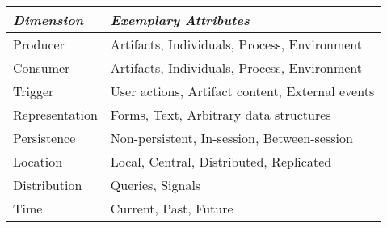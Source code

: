 \batchmode
%
\makeatletter







\def\PsfigVersion{1.9}

\makeatother
\newenvironment{tex2html_wrap}{}{}
\newwrite\lthtmlwrite
\def\lthtmltypeout#1{{\let\protect\string\immediate\write\lthtmlwrite{#1}}}%
\newbox\sizebox

\pagestyle{empty}
{\newpage
\clearpage
\samepage \begin{tabular}{|p{1in}|p{2in}|} \hline   
{\em Dimension} & {\em Exemplary Attributes} \\  \hline
Producer & Artifacts,  Individuals,  Process, Environment     \\  \hline
Consumer & Artifacts,  Individuals,  Process, Environment     \\  \hline
Trigger & User actions, Artifact content, External events   \\  \hline
Representation & Forms, Text, Arbitrary data structures      \\  \hline
Persistence & Non-persistent, In-session, Between-session    \\  \hline
Location & Local, Central, Distributed, Replicated           \\  \hline
Distribution & Queries, Signals                              \\  \hline
Time         & Current, Past, Future                         \\  \hline
\end{tabular}
}

{\newpage
\clearpage
\samepage \begin{figure}[t]
  \centerline{} 

\label{fig:snoopy}
\end{figure}
}

{\newpage
\clearpage
\samepage \begin{figure}[t]
  \centerline{} 

\label{fig:toc}
\end{figure}
}



